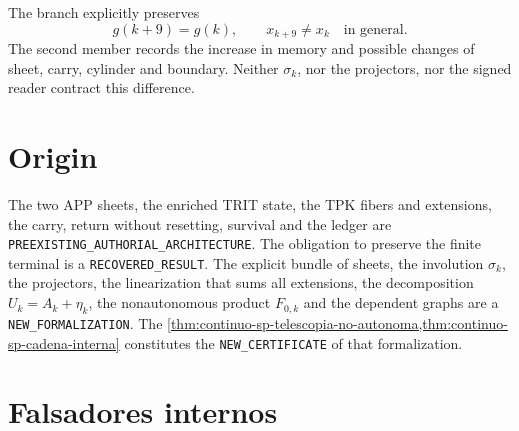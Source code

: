 The branch explicitly preserves
\begin{equation}
\label{eq:continuo-sp-no-reset}
 g(k+9)=g(k),
 \qquad
 x_{k+9}\neq x_k\quad\text{in general}.
\end{equation}
The second member records the increase in memory and possible changes
of sheet, carry, cylinder and boundary. Neither \(\sigma_k\), nor the projectors, nor
the signed reader contract this difference.

\section{Origin}

The two APP sheets, the enriched TRIT state, the TPK fibers and extensions,
the carry, return without resetting, survival and the ledger are
\texttt{PREEXISTING\_AUTHORIAL\_ARCHITECTURE}. The obligation to preserve the
finite terminal is a \texttt{RECOVERED\_RESULT}. The explicit bundle of sheets,
the involution \(\sigma_k\), the projectors, the linearization that sums all
extensions, the decomposition \(U_k=A_k+\eta_k\), the nonautonomous
product \(F_{0,k}\) and the dependent graphs are a
\texttt{NEW\_FORMALIZATION}. The
\cref{thm:continuo-sp-telescopia-no-autonoma,thm:continuo-sp-cadena-interna}
constitutes the \texttt{NEW\_CERTIFICATE} of that formalization.

\section{Falsadores internos}

